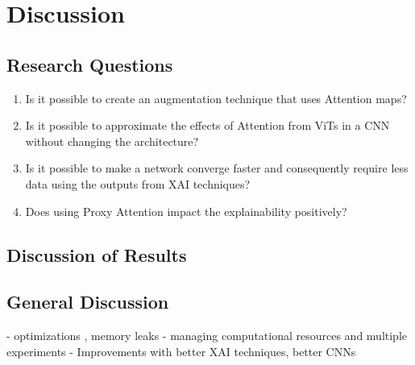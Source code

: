 \chapter{Discussion} \label{ch:discussion}
\section{Research Questions}
\begin{enumerate}
    \item Is it possible to create an augmentation technique that uses Attention maps?
    \item Is it possible to approximate the effects of Attention from ViTs in a CNN without changing the architecture?
    \item Is it possible to make a network converge faster and consequently require less data using the outputs from XAI techniques?
    \item Does using Proxy Attention impact the explainability positively?
\end{enumerate}

\section{Discussion of Results}

\section{General Discussion}
- optimizations , memory leaks
- managing computational resources and multiple experiments
- Improvements with better XAI techniques, better CNNs